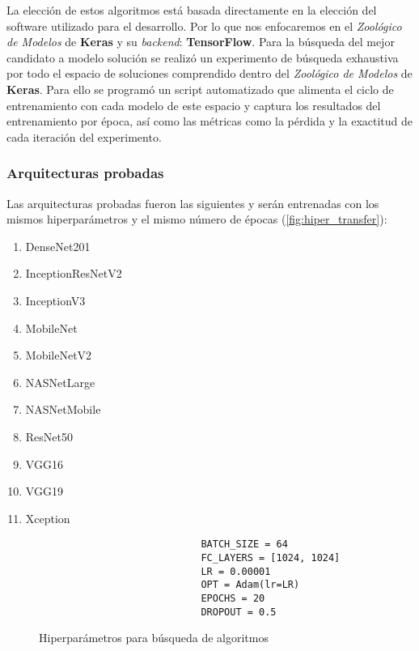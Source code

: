 La elección de estos algoritmos está basada directamente en la elección del
software utilizado para el desarrollo. Por lo que nos enfocaremos en el
\emph{Zoológico de Modelos} de \textbf{Keras} y su \emph{backend}:
\textbf{TensorFlow}. Para la búsqueda del mejor candidato a modelo solución se
realizó un experimento de búsqueda exhaustiva por todo el espacio de soluciones
comprendido dentro del \emph{Zoológico de Modelos} de \textbf{Keras}. Para ello
se programó un script automatizado que alimenta el ciclo de entrenamiento con
cada modelo de este espacio y captura los resultados del entrenamiento por
época, así como las métricas como la pérdida y la exactitud de cada iteración
del experimento.

\subsubsection{Arquitecturas probadas}

Las arquitecturas probadas fueron las siguientes y serán entrenadas con los
mismos hiperparámetros y el mismo número de épocas
(\autoref{fig:hiper_transfer}):

\begin{enumerate}
    \item DenseNet201
    \item InceptionResNetV2
    \item InceptionV3
    \item MobileNet
    \item MobileNetV2
    \item NASNetLarge
    \item NASNetMobile
    \item ResNet50
    \item VGG16
    \item VGG19
    \item Xception
\end{enumerate}

\begin{figure}[H]
    \centering
    \begin{verbatim}
                            BATCH_SIZE = 64
                            FC_LAYERS = [1024, 1024]
                            LR = 0.00001
                            OPT = Adam(lr=LR)
                            EPOCHS = 20
                            DROPOUT = 0.5
    \end{verbatim}
    \caption{Hiperparámetros para búsqueda de algoritmos}\label{fig:hiper_transfer}
\end{figure}

